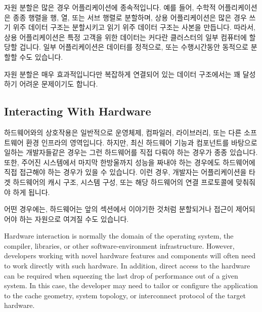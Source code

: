 자원 분할은 많은 경우 어플리케이션에 종속적입니다.
예를 들어, 수학적 어플리케이션은 종종 행렬을 행, 열, 또는 서브 행렬로 분할하며,
상용 어플리케이션은 많은 경우 쓰기 위주 데이터 구조는 분할시키고 읽기 위주
데이터 구조는 사본을 만듭니다.
따라서, 상용 어플리케이션은 특정 고객을 위한 데이터는 커다란 클러스터의 일부
컴퓨터에 할당할 겁니다.
일부 어플리케이션은 데이터를 정적으로, 또는 수행시간동안 동적으로 분할할 수도
있습니다.

자원 분할은 매우 효과적입니다만 복잡하게 연결되어 있는 데이터 구조에서는 꽤
달성하기 어려운 문제이기도 합니다.

\subsection{Interacting With Hardware}
\label{sec:Interacting With Hardware}

하드웨어와의 상호작용은 일반적으로 운영체제, 컴파일러, 라이브러리, 또는 다른
소프트웨어 환경 인프라의 영역입니다.
하지만, 최신 하드웨어 기능과 컴포넌트를 바탕으로 일하는 개발자들같은 경우는
그런 하드웨어를 직접 다뤄야 하는 경우가 종종 있습니다.
또한, 주어진 시스템에서 마지막 한방울까지 성능을 짜내야 하는 경우에도
하드웨어에 직접 접근해야 하는 경우가 있을 수 있습니다.
이런 경우, 개발자는 어플리케이션을 타겟 하드웨어의 캐시 구조, 시스템 구성, 또는
해당 하드웨어의 연결 프로토콜에 맞춰줘야 하게 됩니다.

어떤 경우에는, 하드웨어는 앞의 섹션에서 이야기한 것처럼 분할되거나 접근이
제어되어야 하는 자원으로 여겨질 수도 있습니다.
\iffalse

Hardware interaction is normally the domain of the operating system,
the compiler, libraries, or other software-environment infrastructure.
However, developers working with novel hardware features and components
will often need to work directly with such hardware.
In addition, direct access to the hardware can be required when squeezing
the last drop of performance out of a given system.
In this case, the developer may need to tailor or configure the application
to the cache geometry, system topology, or interconnect protocol of the
target hardware.

